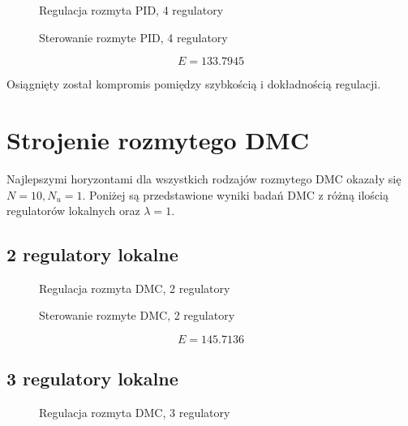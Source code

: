 \begin{figure}[H]
\centering

\caption{Regulacja rozmyta PID, 4 regulatory}
\end{figure}

\begin{figure}[H]
\centering

\caption{Sterowanie rozmyte PID, 4 regulatory}
\end{figure}

\begin{equation}
    E = \num{133,7945}
\end{equation}

Osiągnięty został kompromis pomiędzy szybkością i dokładnością regulacji.

\section{Strojenie rozmytego DMC}

Najlepszymi horyzontami dla wszystkich rodzajów rozmytego DMC okazały się $N = 10, N_u = 1$. Poniżej są przedstawione wyniki badań DMC z różną ilością regulatorów lokalnych oraz $\lambda = 1$.

\subsection{2 regulatory lokalne}

\begin{figure}[H]
\centering

\caption{Regulacja rozmyta DMC, 2 regulatory}
\end{figure}

\begin{figure}[H]
\centering

\caption{Sterowanie rozmyte DMC, 2 regulatory}
\end{figure}

\begin{equation}
    E = \num{145,7136}
\end{equation}

\subsection{3 regulatory lokalne}

\begin{figure}[H]
\centering

\caption{Regulacja rozmyta DMC, 3 regulatory}
\end{figure}

